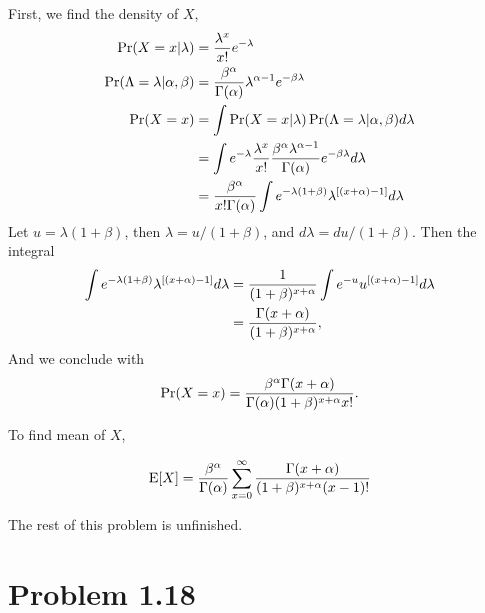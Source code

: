 \documentclass{scrartcl}
\begin{document}
First, we find the density of $X$,
\begin{equation}
	\begin{split}
		\Pr(X=x|\lambda)
			& = {\lambda^x \over x!} e^{-\lambda} \\
		\Pr(\Lambda = \lambda | \alpha, \beta)
			& = {\beta^\alpha \over \Gamma(\alpha)} \lambda^{\alpha-1}e^{-\beta\lambda} \\
		\Pr(X=x)
			& = \int \Pr(X=x|\lambda) \Pr(\Lambda = \lambda | \alpha, \beta) d\lambda \\
			& = \int e^{-\lambda} {\lambda^x \over x!} {\beta^\alpha \lambda^{\alpha-1} \over \Gamma(\alpha)}
				e^{-\beta\lambda} d\lambda \\
			& = {\beta^\alpha \over { x! \Gamma(\alpha) }}
			    \int e^{-\lambda(1+\beta)} \lambda^{[(x+\alpha)-1]} d\lambda
	\end{split}
\end{equation}
Let $u = \lambda(1+\beta)$, then $\lambda = u/(1+\beta)$, and $d\lambda = du/(1+\beta)$.
Then the integral
\begin{equation}
\begin{split}
\int e^{-\lambda(1+\beta)} \lambda^{[(x+\alpha)-1]} d\lambda
& = {1 \over (1+\beta)^{x+\alpha}} \int e^{-u} u^{[(x+\alpha)-1]} d\lambda \\
& = {\Gamma(x+\alpha) \over {(1+\beta)^{x+\alpha}}} ,
\end{split}
\end{equation}
And we conclude with
\begin{equation}
\Pr(X=x) = {\beta^\alpha \Gamma(x+\alpha) \over {\Gamma(\alpha)(1+\beta)^{x+\alpha}}x!} .
\end{equation}

To find mean of $X$,

\begin{equation}
	\mathrm{E}[X] = {\beta^\alpha \over \Gamma(\alpha)}
	        \sum_{x = 0}^{\infty} \frac{\Gamma(x+\alpha)}{(1+\beta)^{x+\alpha}(x-1)!}
\end{equation}

The rest of this problem is unfinished.


\section*{Problem 1.18}
\end{document}
